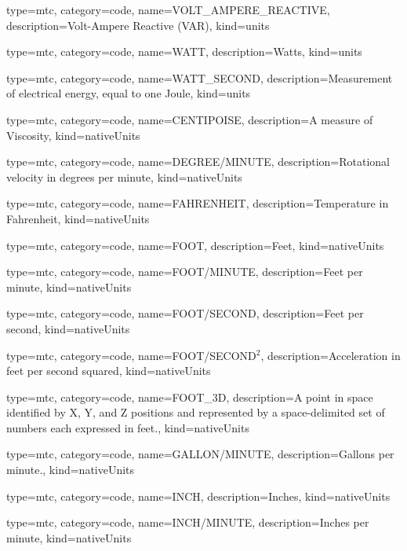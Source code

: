 {
  type=mtc,
  category=code,
  name={VOLT\_AMPERE\_REACTIVE},
  description={Volt-Ampere Reactive  (VAR)},
  kind={units}
}


{
  type=mtc,
  category=code,
  name={WATT},
  description={Watts},
  kind={units}
}


{
  type=mtc,
  category=code,
  name={WATT\_SECOND},
  description={Measurement of electrical energy, equal to one Joule},
  kind={units}
}


{
  type=mtc,
  category=code,
  name={CENTIPOISE},
  description={A measure of Viscosity},
  kind={nativeUnits}
}


{
  type=mtc,
  category=code,
  name={DEGREE/MINUTE},
  description={Rotational velocity in degrees per minute},
  kind={nativeUnits}
}


{
  type=mtc,
  category=code,
  name={FAHRENHEIT},
  description={Temperature in Fahrenheit},
  kind={nativeUnits}
}


{
  type=mtc,
  category=code,
  name={FOOT},
  description={Feet},
  kind={nativeUnits}
}


{
  type=mtc,
  category=code,
  name={FOOT/MINUTE},
  description={Feet per minute},
  kind={nativeUnits}
}


{
  type=mtc,
  category=code,
  name={FOOT/SECOND},
  description={Feet per second},
  kind={nativeUnits}
}


{
  type=mtc,
  category=code,
  name={FOOT/SECOND$^2$},
  description={Acceleration in feet per second squared},
  kind={nativeUnits}
}


{
  type=mtc,
  category=code,
  name={FOOT\_3D},
  description={A point in space identified by X, Y, and Z positions and represented by a space-delimited set of numbers each expressed in feet.},
  kind={nativeUnits}
}


{
  type=mtc,
  category=code,
  name={GALLON/MINUTE},
  description={Gallons per minute.},
  kind={nativeUnits}
}


{
  type=mtc,
  category=code,
  name={INCH},
  description={Inches},
  kind={nativeUnits}
}


{
  type=mtc,
  category=code,
  name={INCH/MINUTE},
  description={Inches per minute},
  kind={nativeUnits}
}


